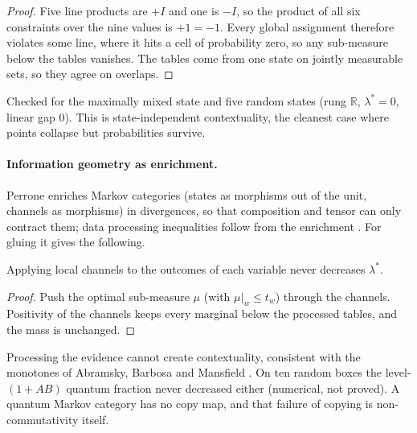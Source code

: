 \documentclass[11pt]{article}
\theoremstyle{definition}\newtheorem{definition}[theorem]{Definition}\newtheorem{remark}[theorem]{Remark}\newtheorem{example}[theorem]{Example}
\newcommand{\R}{\mathbb R}
\begin{document}
\begin{proof}
Five line products are $+I$ and one is $-I$, so the product of all six constraints over the nine values is $+1=-1$. Every global assignment
therefore violates some line, where it hits a cell of probability zero, so any sub-measure below the tables vanishes. The tables come from one
state on jointly measurable sets, so they agree on overlaps.
\end{proof}

Checked for the maximally mixed state and five random states (rung $\R$, $\lambda^*=0$, linear gap $0$). This is state-independent
contextuality, the cleanest case where points collapse but probabilities survive.

\paragraph{Information geometry as enrichment.}
Perrone enriches Markov categories (states as morphisms out of the unit, channels as morphisms) in divergences, so that composition and tensor
can only contract them; data processing inequalities follow from the enrichment \cite{Perrone2023,Fritz2020}. For gluing it gives the following.

\begin{proposition}\label{prop:dpi}
Applying local channels to the outcomes of each variable never decreases $\lambda^*$.
\end{proposition}

\begin{proof}
Push the optimal sub-measure $\mu$ (with $\mu|_w\le t_w$) through the channels. Positivity of the channels keeps every marginal below the
processed tables, and the mass is unchanged.
\end{proof}

Processing the evidence cannot create contextuality, consistent with the monotones of Abramsky, Barbosa and Mansfield
\cite{AbramskyBarbosaMansfield2017}. On ten random boxes the level-$(1{+}AB)$ quantum fraction never decreased either (numerical, not
proved). A quantum Markov category has no copy map, and that failure of copying is non-commutativity itself.
\end{document}
